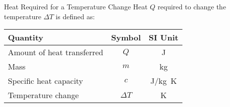 \documentclass[12pt,aspectratio=169]{beamer}
\newcommand{\eq}[2]{\vspace{#1}{\Large\begin{displaymath}#2\end{displaymath}}}
\begin{document}
\begin{frame}{Heat Required for a Temperature Change}
  Heat $Q$ required to change the temperature $\Delta T$ is defined as:
  
  \eq{-.2in}{
    \boxed{Q = mc\Delta T}
  }
  \begin{center}
    \begin{tabular}{l|c|c}
      \rowcolor{pink}
      \textbf{Quantity}      & \textbf{Symbol} & \textbf{SI Unit} \\ \hline
      Amount of heat transferred  & $Q$ & \si{\joule} \\
      Mass                        & $m$ & \si{\kilo\gram} \\
      Specific heat capacity      & $c$ & \si{J/kg.K}\\
      Temperature change          & $\Delta T$ & \si{\kelvin}
    \end{tabular}
  \end{center}
\end{frame}
\end{document}
